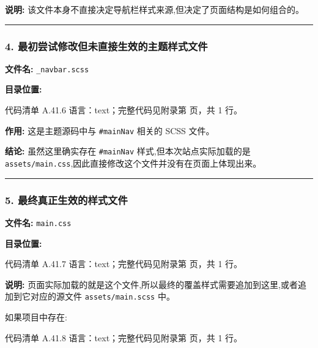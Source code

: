 \documentclass[lang=cn,scheme=chinese,color=blue,device=normal,toc=onecol,math=cm]{elegantbook}
\begin{document}
\textbf{说明:} 该文件本身不直接决定导航栏样式来源,但决定了页面结构是如何组合的。\par


\medskip\hrule\medskip


\subsubsection{4. 最初尝试修改但未直接生效的主题样式文件}


\textbf{文件名:} \texttt{\_\allowbreak{}navbar.scss}\par


\textbf{目录位置:}\par


\begin{codeindexbox}{代码清单 A.41.6}
语言：text；完整代码见附录第 \pageref{code:41:6} 页，共 1 行。
\end{codeindexbox}


\textbf{作用:} 这是主题源码中与 \texttt{\#mainNav} 相关的 SCSS 文件。\par


\textbf{结论:} 虽然这里确实存在 \texttt{\#mainNav} 样式,但本次站点实际加载的是 \texttt{assets/\allowbreak{}main.css},因此直接修改这个文件并没有在页面上体现出来。\par


\medskip\hrule\medskip


\subsubsection{5. 最终真正生效的样式文件}


\textbf{文件名:} \texttt{main.css}\par


\textbf{目录位置:}\par


\begin{codeindexbox}{代码清单 A.41.7}
语言：text；完整代码见附录第 \pageref{code:41:7} 页，共 1 行。
\end{codeindexbox}


\textbf{说明:} 页面实际加载的就是这个文件,所以最终的覆盖样式需要追加到这里,或者追加到它对应的源文件 \texttt{assets/\allowbreak{}main.scss} 中。\par


如果项目中存在:\par


\begin{codeindexbox}{代码清单 A.41.8}
语言：text；完整代码见附录第 \pageref{code:41:8} 页，共 1 行。
\end{codeindexbox}
\end{document}
